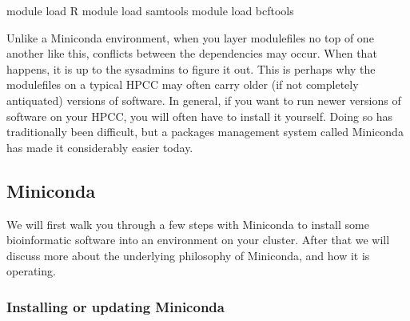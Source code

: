 \documentclass[]{krantz}
\makeatletter
\newenvironment{Shaded}{\begin{snugshade}}{\end{snugshade}}
\newcommand{\ExtensionTok}[1]{#1}
\newcommand{\NormalTok}[1]{#1}
\newenvironment{kframe}{%
\medskip{}
\setlength{\fboxsep}{.8em}
 \def\at@end@of@kframe{}%
 \ifinner\ifhmode%
  \def\at@end@of@kframe{\end{minipage}}%
  \begin{minipage}{\columnwidth}%
 \fi\fi%
 \def\FrameCommand##1{\hskip\@totalleftmargin \hskip-\fboxsep
 \colorbox{shadecolor}{##1}\hskip-\fboxsep
     \hskip-\linewidth \hskip-\@totalleftmargin \hskip\columnwidth}%
 \MakeFramed {\advance\hsize-\width
   \@totalleftmargin\z@ \linewidth\hsize
   \@setminipage}}%
 {\par\unskip\endMakeFramed%
 \at@end@of@kframe}
\renewenvironment{Shaded}{\begin{kframe}}{\end{kframe}}
\makeatother
\begin{document}
\begin{Shaded}
\begin{Highlighting}[]
\ExtensionTok{module}\NormalTok{ load R}
\ExtensionTok{module}\NormalTok{ load samtools}
\ExtensionTok{module}\NormalTok{ load bcftools}
\end{Highlighting}
\end{Shaded}

Unlike a Miniconda environment, when you layer modulefiles no top of one another
like this, conflicts between the dependencies may occur. When that happens,
it is up to the sysadmins to figure it out. This is perhaps why the modulefiles
on a typical HPCC may often carry older (if not
completely antiquated) versions of software. In general, if you want to run
newer versions of software on your HPCC, you will often have to install it yourself.
Doing so has traditionally been difficult, but a packages management system called
Miniconda has made it considerably easier today.

\hypertarget{miniconda}{%
\subsection{Miniconda}\label{miniconda}}

We will first walk you through a few steps with Miniconda to install some
bioinformatic software into an environment on your cluster. After that we will discuss more about
the underlying philosophy of Miniconda, and how it is operating.

\hypertarget{installing-or-updating-miniconda}{%
\subsubsection{Installing or updating Miniconda}\label{installing-or-updating-miniconda}}
\end{document}
